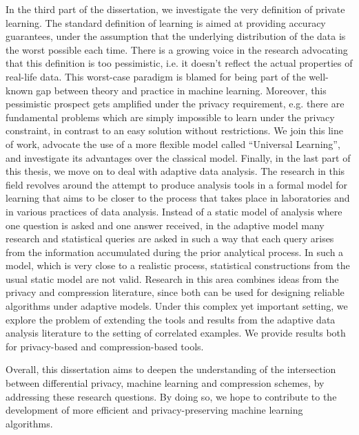 In the third part of the dissertation, we investigate the very definition of private learning. The standard definition of learning is aimed at providing accuracy guarantees, under the assumption that the underlying distribution of the data is the worst possible each time. There is a growing voice in the research advocating that this definition is too pessimistic, i.e. it doesn’t reflect the actual properties of real-life data. This worst-case paradigm is blamed for being part of the well-known gap between theory and practice in machine learning. Moreover, this pessimistic prospect gets amplified under the privacy requirement, e.g. there are fundamental problems which are simply impossible to learn under the privacy constraint, in contrast to an easy solution without restrictions. We join this line of work, advocate the use of a more flexible model called “Universal Learning”, and investigate its advantages over the classical model. 
Finally, in the last part of this thesis, we move on to deal with adaptive data analysis. The research in this field revolves around the attempt to produce analysis tools in a  formal model for learning that aims to be closer to the process that takes place in laboratories and in various practices of data analysis. Instead of a static model of analysis where one question is asked and one answer received, in the adaptive model many research and statistical queries are asked in such a way that each query arises from the information accumulated during the prior analytical process. In such a model, which is very close to a realistic process, statistical constructions from the usual static model are not valid. Research in this area combines ideas from the privacy and compression literature, since both can be used for designing reliable algorithms under adaptive models. Under this complex yet important setting, we explore the problem of extending the tools and results from the adaptive data analysis literature to the setting of correlated examples. We provide results both for privacy-based and compression-based tools.


Overall, this dissertation aims to deepen the understanding of the intersection between differential privacy, machine learning and compression schemes, by addressing these research questions. By doing so, we hope to contribute to the development of more efficient and privacy-preserving machine learning algorithms.




